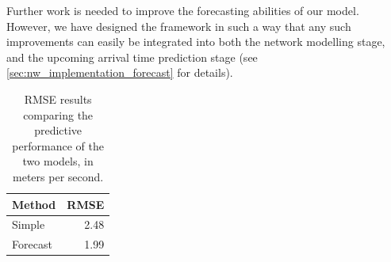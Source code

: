 Further work is needed to improve the forecasting abilities of our model. However, we have designed the framework in such a way that any such improvements can easily be integrated into both the network modelling stage, and the upcoming arrival time prediction stage (see \cref{sec:nw_implementation_forecast} for details).

\begin{table}

\caption{\label{tab:tt_pred_rmse}RMSE results comparing the predictive performance of the two models, in meters per second.}
\centering
\begin{tabular}[t]{lr}
\toprule
Method & RMSE\\
\midrule
Simple & 2.48\\
Forecast & 1.99\\
\bottomrule
\end{tabular}
\end{table}



